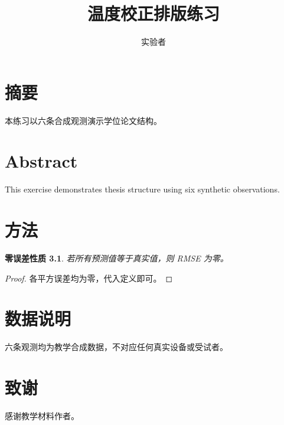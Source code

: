 \documentclass[UTF8,fontset=fandol,openany]{ctexbook}
\title{温度校正排版练习}\author{实验者}\date{}
\newtheorem{theorem}{零误差性质}[chapter]
\begin{document}
\frontmatter
\maketitle
\chapter{摘要}本练习以六条合成观测演示学位论文结构。\chapter{Abstract}This exercise demonstrates thesis structure using six synthetic observations.
\tableofcontents\listoffigures\listoftables
\mainmatter
\chapter{方法}\label{chap:method}
\begin{theorem}若所有预测值等于真实值，则 RMSE 为零。\end{theorem}
\begin{proof}各平方误差均为零，代入定义即可。\end{proof}
\appendix
\chapter{数据说明}六条观测均为教学合成数据，不对应任何真实设备或受试者。
\backmatter
\chapter{致谢}感谢教学材料作者。
\end{document}
